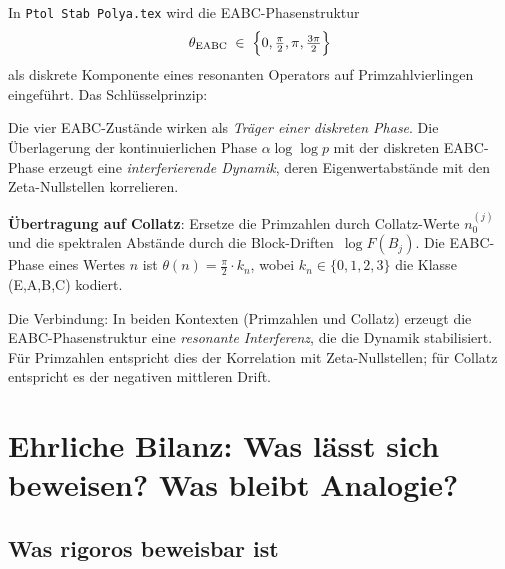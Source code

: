 \documentclass[12pt,a4paper]{article}
\begin{document}
In \texttt{Ptol Stab Polya.tex} wird die EABC-Phasenstruktur
\[
  \theta_{\mathrm{EABC}} \;\in\; \Bigl\{0, \tfrac{\pi}{2}, \pi, \tfrac{3\pi}{2}\Bigr\}
\]
als diskrete Komponente eines resonanten Operators auf Primzahlvierlingen
eingeführt. Das Schlüsselprinzip:

\begin{tcolorbox}[adisch, title={Stabilitätsprinzip (Hilbert-Pólya-Modul)}]
Die vier EABC-Zustände wirken als \emph{Träger einer diskreten Phase}.
Die Überlagerung der kontinuierlichen Phase $\alpha \log\log p$ mit der
diskreten EABC-Phase erzeugt eine \emph{interferierende Dynamik}, deren
Eigenwertabstände mit den Zeta-Nullstellen korrelieren.

\textbf{Übertragung auf Collatz}: Ersetze die Primzahlen durch Collatz-Werte
$n_0^{(j)}$ und die spektralen Abstände durch die Block-Driften~$\log F(B_j)$.
Die EABC-Phase eines Wertes $n$ ist $\theta(n) = \frac{\pi}{2} \cdot k_n$,
wobei $k_n \in \{0,1,2,3\}$ die Klasse (E,A,B,C) kodiert.
\end{tcolorbox}

Die Verbindung: In beiden Kontexten (Primzahlen und Collatz) erzeugt die
EABC-Phasenstruktur eine \emph{resonante Interferenz}, die die Dynamik stabilisiert.
Für Primzahlen entspricht dies der Korrelation mit Zeta-Nullstellen; für Collatz
entspricht es der negativen mittleren Drift.

\section{Ehrliche Bilanz: Was lässt sich beweisen? Was bleibt Analogie?}
\label{sec:bilanz}

\subsection{Was rigoros beweisbar ist}
\end{document}
